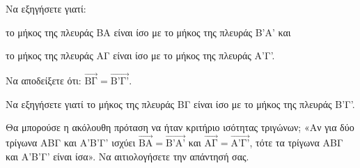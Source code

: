 \begin{alist}
    \item Να εξηγήσετε γιατί:
    \begin{rlist}
        \item το μήκος της πλευράς ΒΑ είναι ίσο με το μήκος της πλευράς Β'Α' και 
        \item το μήκος της πλευράς ΑΓ είναι ίσο με το μήκος της πλευράς Α'Γ'. 
    \end{rlist}
    \item
    \begin{rlist}
        \item Να αποδείξετε ότι: $\overrightarrow{\text{ΒΓ}} = \overrightarrow{\text{B'Γ'}}$. 
        \item Να εξηγήσετε γιατί το μήκος της πλευράς ΒΓ είναι ίσο με το μήκος της πλευράς Β'Γ'. 
    \end{rlist}
    \item Θα μπορούσε η ακόλουθη πρόταση να ήταν κριτήριο ισότητας τριγώνων;
    «Αν για δύο τρίγωνα ΑΒΓ και Α'Β'Γ' ισχύει $\overrightarrow{\text{BA}} = \overrightarrow{\text{B'A'}}$ και $\overrightarrow{\text{ΑΓ}} = \overrightarrow{\text{A'Γ'}}$, τότε τα τρίγωνα ΑΒΓ και Α'Β'Γ' είναι ίσα».
    Να αιτιολογήσετε την απάντησή σας. 
\end{alist}